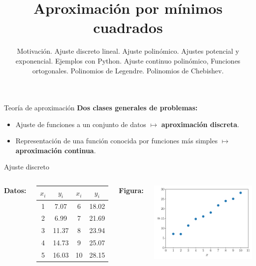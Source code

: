 \documentclass[9pt, aspectratio=169]{beamer}
\title{Aproximación por mínimos cuadrados}
\subtitle{Motivación. Ajuste discreto lineal. Ajuste polinómico. Ajustes potencial y exponencial. Ejemplos con Python. Ajuste continuo polinómico, Funciones ortogonales. Polinomios de Legendre. Polinomios de Chebishev.}
\begin{document}
\maketitle

\begin{frame}{Teoría de aproximación}
    \textbf{Dos clases generales de problemas:}
    \begin{itemize}
      \item Ajuste de funciones a un conjunto de datos $\mapsto$ \textbf{aproximación discreta}.
        \item Representación de una función conocida por funciones más simples $\mapsto$ \textbf{aproximación continua}.
    \end{itemize}
\end{frame}


\begin{frame}[standout]
    \begin{center}
        {\Huge Ajuste discreto}
    \end{center}
\end{frame}

\begin{frame}
\begin{columns}[t]
\textbf{Datos:}

\begin{center}
\begin{tabular}{cccc}
\toprule
$x_i$ & $y_i$ & $x_i$ & $y_i$ \\
\midrule
 1 & 7.07 &  6 & 18.02 \\
 2 & 6.99 &  7 & 21.69 \\
 3 & 11.37 &  8 & 23.94 \\
 4 & 14.73 &  9 & 25.07 \\
 5 & 16.03 & 10 & 28.15 \\
\bottomrule
\end{tabular}
\end{center}

\textbf{Figura:}
\begin{center}
    \includegraphics[scale=0.40]{figs/fig-01.pdf}
\end{center}
\end{columns}
\end{frame}
\end{document}
